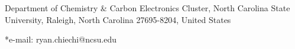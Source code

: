 \begin{affiliations}
 	\item Department of Chemistry \& Carbon Electronics Cluster, North Carolina State University, Raleigh, North
Carolina 27695-8204, United States
	\item[] *e-mail: ryan.chiechi@ncsu.edu
\end{affiliations}
